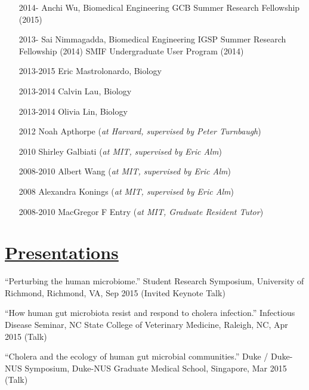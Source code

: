 \documentclass[overlapped,line,11pt]{res}
\begin{document}
\begin{resume}
\begin{itemize}[leftmargin=2cm, style=sameline, itemsep=0mm]
\item[2014-] Anchi Wu, Biomedical Engineering \newline 
  GCB Summer Research Fellowship (2015)
\item[2013-] Sai Nimmagadda, Biomedical Engineering \newline
  IGSP Summer Research Fellowship (2014) \newline
  SMIF Undergraduate User Program (2014)
\item[2013-2015] Eric Mastrolonardo, 
  Biology 
\item[2013-2014] Calvin Lau, Biology 
\item[2013-2014] Olivia Lin, Biology
\item[2012] Noah Apthorpe (\emph{at Harvard, supervised by Peter Turnbaugh})
\item[2010] Shirley Galbiati (\emph{at MIT, supervised by Eric Alm})
\item[2008-2010] Albert Wang (\emph{at MIT, supervised by Eric Alm})
\item[2008] Alexandra Konings (\emph{at MIT, supervised by Eric Alm})
\item[2008-2010] MacGregor F Entry (\emph{at MIT, Graduate Resident Tutor})
\end{itemize}

\section{\underline{\sc Presentations}}
\vspace{.25in}

\begin{revnumerate}[39]

\item {``Perturbing the human microbiome.''
  Student Research Symposium, University of Richmond, Richmond, VA, Sep 2015
  (Invited Keynote Talk)}
\vspace*{0mm}

\item {``How human gut microbiota resist and respond to cholera infection.''
  Infectious Disease Seminar, NC State College of Veterinary Medicine, Raleigh, NC, Apr 2015
  (Talk)}
\vspace*{0mm}

\item {``Cholera and the ecology of human gut microbial communities.''
  Duke / Duke-NUS Symposium, Duke-NUS Graduate Medical School, Singapore, Mar 2015 (Talk)}
\vspace*{0mm}


\end{revnumerate}
\end{resume}
\end{document}
